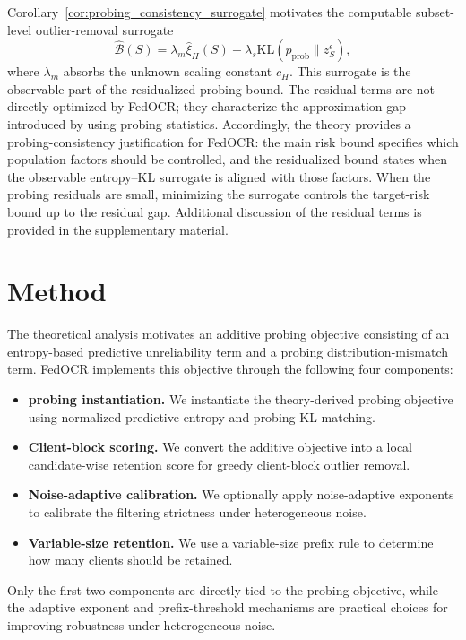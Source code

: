 ﻿\documentclass[conference]{IEEEtran}
\theoremstyle{definition}
\theoremstyle{remark}
\begin{document}
Corollary~\ref{cor:probing_consistency_surrogate} motivates the computable subset-level outlier-removal surrogate
\begin{equation}
\label{eq:probing_surrogate_objective}
\widehat{\mathcal B}(S)
=
\lambda_m\widehat{\xi}_{H}(S)
+
\lambda_s
\mathrm{KL}
\left(
p_{\mathrm{prob}}\|z_S^\epsilon
\right),
\end{equation}
where $\lambda_m$ absorbs the unknown scaling constant $c_H$.
This surrogate is the observable part of the residualized probing bound.
The residual terms are not directly optimized by FedOCR; they characterize the approximation gap introduced by using probing statistics.
Accordingly, the theory provides a probing-consistency justification for FedOCR: the main risk bound specifies which population factors should be controlled, and the residualized bound states when the observable entropy--KL surrogate is aligned with those factors.
When the probing residuals are small, minimizing the surrogate controls the target-risk bound up to the residual gap.
Additional discussion of the residual terms is provided in the supplementary material.

\section{Method}
\label{sec:method}

The theoretical analysis motivates an additive probing objective consisting of an entropy-based predictive unreliability term and a probing distribution-mismatch term. 
FedOCR implements this objective through the following four components:
\begin{itemize}
	\item \textbf{probing instantiation.} We instantiate the theory-derived probing objective using normalized predictive entropy and probing-KL matching.
	\item \textbf{Client-block scoring.} We convert the additive objective into a local candidate-wise retention score for greedy client-block outlier removal.
	\item \textbf{Noise-adaptive calibration.} We optionally apply noise-adaptive exponents to calibrate the filtering strictness under heterogeneous noise.
	\item \textbf{Variable-size retention.} We use a variable-size prefix rule to determine how many clients should be retained.
\end{itemize}
Only the first two components are directly tied to the probing objective, while the adaptive exponent and prefix-threshold mechanisms are practical choices for improving robustness under heterogeneous noise.
\end{document}
